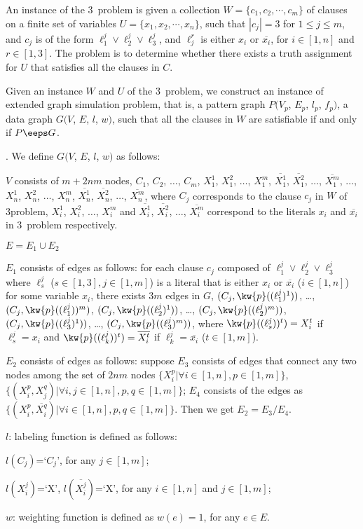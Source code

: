 An instance of the 3\SAT\ problem is given a collection $W=\{c_1,c_2,\cdots,c_m\}$ of clauses on a finite set of variables $U=\{x_1,x_2,\cdots,x_n\}$, such that $|c_j|=3$ for $1 \leq j \leq m$, and $c_j$ is of the form $\ell_1^j\vee \ell_2^j\vee \ell_3^j$, and $\ell_j^r$ is either
$x_i$ or $\overline{x_i}$, for $i\in [1, n]$ and $r\in [1, 3]$. The problem is to determine whether there exists a truth assignment for $U$ that satisfies all the clauses in $C$.

Given an instance $W$ and $U$ of the 3\SAT\ problem, we construct an instance of extended graph simulation problem, that is, a pattern graph $P(V_p$, $E_p$, $l_p$, $f_p)$, a data graph $G(V$, $E$, $l$, $w)$, such that all the clauses in $W$ are satisfiable if and only if $P \eeps G$.

. We define $G(V$, $E$, $l$, $w)$ as follows:
\be
\item [(1)]$V$ consists of $m+2nm$ nodes, $C_1$, $C_2$, $\ldots$, $C_m$, $X_1^1$, $X_1^2$, $\ldots$, $X_1^m$, $\overline{X_1^1}$, $\overline{X_1^2}$, $\ldots$, $\overline{X_1^m}$, $\ldots$, $X_n^1$, $X_n^2$, $\ldots$, $X_n^m$, $\overline{X_n^1}$, $\overline{X_n^2}$, $\ldots$, $\overline{X_n^m}$, where $C_j$ corresponds to the clause $c_j$ in $W$ of 3\SAT problem, $X_i^1$, $X_i^2$, $\ldots$, $X_i^m$ and $\overline{X_i^1}$, $\overline{X_i^2}$, $\ldots$, $\overline{X_i^m}$ correspond to the literals $x_i$ and $\overline{x_i}$ in 3\SAT\ problem respectively.
\item [(2)]$E = E_1 \cup E_2$
\be
\item [(a)]$E_1$ consists of edges as follows: for each clause $c_j$ composed of $\ell_1^j\vee \ell_2^j\vee \ell_3^j$ where $\ell_s^j$ ($s\in [1,3], j\in [1, m]$) is a literal that is either $x_i$ or $\overline{x_i}$ ($i\in [1, n]$) for some variable $x_i$, there exists $3m$ edges in $G$, $(C_j, \kw{p}((\ell_1^j)^1))$, \ldots, $(C_j, \kw{p}((\ell_1^j))^m)$, $(C_j, \kw{p}((\ell_2^j)^1))$, \ldots, $(C_j, \kw{p}((\ell_2^j)^m))$, $(C_j, \kw{p}((\ell_3^j)^1))$, \ldots, $(C_j,
    \kw{p}((\ell_3^j)^m))$, where $\kw{p}((\ell_s^j))^t) = X_i^t$ if $\ell_s^j = x_i$ and $\kw{p}((\ell_k^j))^t) = \overline{X_i^t}$ if $\ell_k^j = \overline{x_i}$ ($t\in[1,m]$).
\item [(b)]$E_2$ consists of edges as follows: suppose $E_3$ consists of edges that connect any two nodes among the set of $2nm$ nodes $\{X_i^p|\forall i \in [1,n], p \in [1,m]\}$, \ie $\{(X_i^p, X_j^q)| \forall i,j \in [1,n], p,q \in [1,m]\}$; $E_4$ consists of the edges as $\{(X_i^p, \overline{X_i^q})| \forall i \in [1,n], p,q \in [1,m]\}$. Then we get $E_2=E_3/E_4$.
\ee
\item [(3)]$l$: labeling function is defined as follows:
\be
\item [(a)]$l(C_j)$=`$C_j$', for any $j \in [1,m]$;
\item [(b)]$l(X_i^j)$=`X', $l(\overline{X_i^j})$=`X', for any $i \in [1,n]$ and $j \in [1,m]$;
\ee
\item [(4)]$w$: weighting function is defined as $w(e)=1$, for any $e \in E$.
\ee


